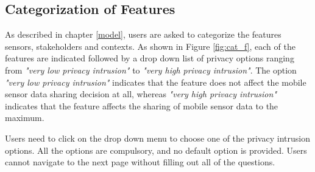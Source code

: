 \subsection{Categorization of Features} \label{cat_feature}

As described in chapter \ref{model}, users are asked to categorize the features sensors, stakeholders and contexts. As shown in Figure 
\ref{fig:cat_f}, each of the features are indicated followed by a drop down list of privacy options ranging from \textit{"very low privacy intrusion"} to \textit{"very high privacy intrusion"}. The option \textit{"very low privacy intrusion"} indicates that the feature does not affect the mobile sensor data sharing decision at all, whereas 
\textit{"very high privacy intrusion"} indicates that the feature affects the sharing of mobile sensor data to the maximum. 

Users need to click on the
drop down menu to choose one of the privacy intrusion options. All the options are compulsory, and no default option is provided. Users cannot navigate to the next page without filling out all of the questions.

